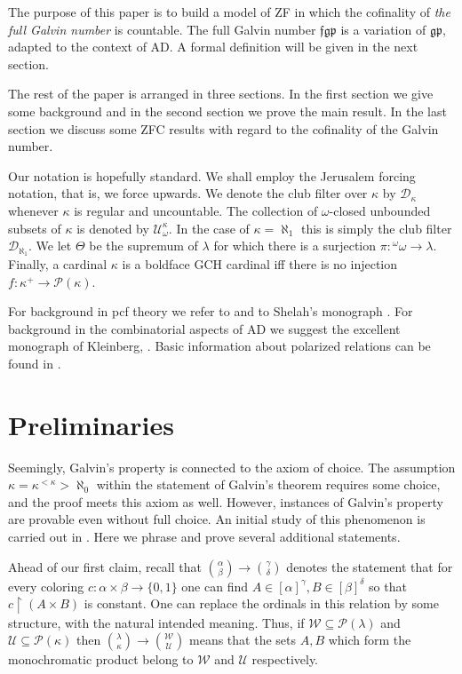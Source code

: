 \documentclass[11pt]{amsart}
\theoremstyle{definition}
\theoremstyle{remark}
\begin{document}
The purpose of this paper is to build a model of \textsf{ZF} in which the cofinality of \emph{the full Galvin number} is countable.
The full Galvin number $\mathfrak{fgp}$ is a variation of $\mathfrak{gp}$, adapted to the context of \textsf{AD}.
A formal definition will be given in the next section.

The rest of the paper is arranged in three sections.
In the first section we give some background and in the second section we prove the main result.
In the last section we discuss some \textsf{ZFC} results with regard to the cofinality of the Galvin number.

Our notation is hopefully standard.
We shall employ the Jerusalem forcing notation, that is, we force upwards.
We denote the club filter over $\kappa$ by $\mathscr{D}_\kappa$ whenever $\kappa$ is regular and uncountable.
The collection of $\omega$-closed unbounded subsets of $\kappa$ is denoted by $\mathscr{U}^\kappa_\omega$.
In the case of $\kappa=\aleph_1$ this is simply the club filter $\mathscr{D}_{\aleph_1}$.
We let $\Theta$ be the supremum of $\lambda$ for which there is a surjection $\pi:{}^\omega\omega\rightarrow\lambda$.
Finally, a cardinal $\kappa$ is a boldface \textsf{GCH} cardinal iff there is no injection $f:\kappa^+\rightarrow\mathcal{P}(\kappa)$.

For background in \textsf{pcf} theory we refer to \cite{MR2768693} and to Shelah's monograph \cite{MR1318912}.
For background in the combinatorial aspects of \textsf{AD} we suggest the excellent monograph of Kleinberg, \cite{MR0479903}.
Basic information about polarized relations can be found in \cite{MR3075383}.

\newpage

\section{Preliminaries}

Seemingly, Galvin's property is connected to the axiom of choice.
The assumption $\kappa=\kappa^{<\kappa}>\aleph_0$ within the statement of Galvin's theorem requires some choice, and the proof meets this axiom as well.
However, instances of Galvin's property are provable even without full choice.
An initial study of this phenomenon is carried out in \cite{bgp}.
Here we phrase and prove several additional statements.

Ahead of our first claim, recall that $\binom{\alpha}{\beta}\rightarrow\binom{\gamma}{\delta}$ denotes the statement that for every coloring $c:\alpha\times\beta\rightarrow\{0,1\}$ one can find $A\in[\alpha]^\gamma,B\in[\beta]^\delta$ so that $c\upharpoonright(A\times{B})$ is constant.
One can replace the ordinals in this relation by some structure, with the natural intended meaning.
Thus, if $\mathscr{W}\subseteq\mathcal{P}(\lambda)$ and $\mathscr{U}\subseteq\mathcal{P}(\kappa)$ then $\binom{\lambda}{\kappa}\rightarrow\binom{\mathscr{W}}{\mathscr{U}}$ means that the sets $A,B$ which form the monochromatic product belong to $\mathscr{W}$ and $\mathscr{U}$ respectively.
\end{document}
